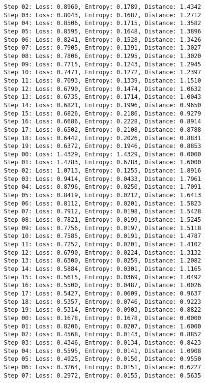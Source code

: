 \documentclass[11pt]{article}
\begin{document}
\begin{Verbatim}[commandchars=\\\{\}]
Step 02: Loss: 0.8960, Entropy: 0.1789, Distance: 1.4342
Step 03: Loss: 0.8043, Entropy: 0.1687, Distance: 1.2712
Step 04: Loss: 0.8506, Entropy: 0.1715, Distance: 1.3582
Step 05: Loss: 0.8595, Entropy: 0.1648, Distance: 1.3896
Step 06: Loss: 0.8241, Entropy: 0.1528, Distance: 1.3426
Step 07: Loss: 0.7905, Entropy: 0.1391, Distance: 1.3027
Step 08: Loss: 0.7806, Entropy: 0.1295, Distance: 1.3020
Step 09: Loss: 0.7715, Entropy: 0.1243, Distance: 1.2945
Step 10: Loss: 0.7471, Entropy: 0.1272, Distance: 1.2397
Step 11: Loss: 0.7093, Entropy: 0.1339, Distance: 1.1510
Step 12: Loss: 0.6790, Entropy: 0.1474, Distance: 1.0632
Step 13: Loss: 0.6735, Entropy: 0.1714, Distance: 1.0043
Step 14: Loss: 0.6821, Entropy: 0.1996, Distance: 0.9650
Step 15: Loss: 0.6826, Entropy: 0.2186, Distance: 0.9279
Step 16: Loss: 0.6686, Entropy: 0.2228, Distance: 0.8914
Step 17: Loss: 0.6502, Entropy: 0.2108, Distance: 0.8788
Step 18: Loss: 0.6442, Entropy: 0.2026, Distance: 0.8831
Step 19: Loss: 0.6372, Entropy: 0.1946, Distance: 0.8853
Step 00: Loss: 1.4329, Entropy: 1.4329, Distance: 0.0000
Step 01: Loss: 1.4783, Entropy: 0.6783, Distance: 1.6000
Step 02: Loss: 1.0713, Entropy: 0.1255, Distance: 1.8916
Step 03: Loss: 0.9414, Entropy: 0.0433, Distance: 1.7961
Step 04: Loss: 0.8796, Entropy: 0.0250, Distance: 1.7091
Step 05: Loss: 0.8419, Entropy: 0.0212, Distance: 1.6413
Step 06: Loss: 0.8112, Entropy: 0.0201, Distance: 1.5823
Step 07: Loss: 0.7912, Entropy: 0.0198, Distance: 1.5428
Step 08: Loss: 0.7821, Entropy: 0.0199, Distance: 1.5245
Step 09: Loss: 0.7756, Entropy: 0.0197, Distance: 1.5118
Step 10: Loss: 0.7585, Entropy: 0.0191, Distance: 1.4787
Step 11: Loss: 0.7252, Entropy: 0.0201, Distance: 1.4102
Step 12: Loss: 0.6790, Entropy: 0.0224, Distance: 1.3132
Step 13: Loss: 0.6300, Entropy: 0.0259, Distance: 1.2082
Step 14: Loss: 0.5884, Entropy: 0.0301, Distance: 1.1165
Step 15: Loss: 0.5615, Entropy: 0.0369, Distance: 1.0492
Step 16: Loss: 0.5500, Entropy: 0.0487, Distance: 1.0026
Step 17: Loss: 0.5427, Entropy: 0.0609, Distance: 0.9637
Step 18: Loss: 0.5357, Entropy: 0.0746, Distance: 0.9223
Step 19: Loss: 0.5314, Entropy: 0.0903, Distance: 0.8822
Step 00: Loss: 0.1678, Entropy: 0.1678, Distance: 0.0000
Step 01: Loss: 0.8206, Entropy: 0.0207, Distance: 1.6000
Step 02: Loss: 0.4568, Entropy: 0.0143, Distance: 0.8852
Step 03: Loss: 0.4346, Entropy: 0.0134, Distance: 0.8423
Step 04: Loss: 0.5595, Entropy: 0.0141, Distance: 1.0908
Step 05: Loss: 0.4925, Entropy: 0.0150, Distance: 0.9550
Step 06: Loss: 0.3264, Entropy: 0.0151, Distance: 0.6227
Step 07: Loss: 0.2972, Entropy: 0.0155, Distance: 0.5635

\end{Verbatim}
\end{document}
